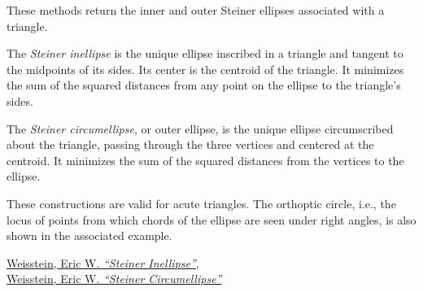 These methods return the inner and outer Steiner ellipses associated with a triangle.

\medskip
\noindent
The \emph{Steiner inellipse} is the unique ellipse inscribed in a triangle and tangent to the midpoints of its sides. Its center is the centroid of the triangle. It minimizes the sum of the squared distances from any point on the ellipse to the triangle’s sides.

\medskip
\noindent
The \emph{Steiner circumellipse}, or outer ellipse, is the unique ellipse circumscribed about the triangle, passing through the three vertices and centered at the centroid. It minimizes the sum of the squared distances from the vertices to the ellipse.

\medskip
\noindent
These constructions are valid for acute triangles. The orthoptic circle, i.e., the locus of points from which chords of the ellipse are seen under right angles, is also shown in the associated example.
\begin{flushright}
\small
\href{https://mathworld.wolfram.com/SteinerInellipse.html}{Weisstein, Eric W. \emph{“Steiner Inellipse”}},\\
\href{https://mathworld.wolfram.com/SteinerCircumellipse.html}{Weisstein, Eric W. \emph{“Steiner Circumellipse”}}
\end{flushright}

\vspace{1em}

